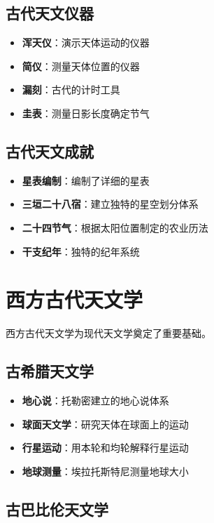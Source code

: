 \documentclass[12pt,UTF8]{ctexbook}
\begin{document}
\subsection{古代天文仪器}

\begin{itemize}
  \item \textbf{浑天仪}：演示天体运动的仪器
  \item \textbf{简仪}：测量天体位置的仪器
  \item \textbf{漏刻}：古代的计时工具
  \item \textbf{圭表}：测量日影长度确定节气
\end{itemize}

\subsection{古代天文成就}

\begin{itemize}
  \item \textbf{星表编制}：编制了详细的星表
  \item \textbf{三垣二十八宿}：建立独特的星空划分体系
  \item \textbf{二十四节气}：根据太阳位置制定的农业历法
  \item \textbf{干支纪年}：独特的纪年系统
\end{itemize}

\section{西方古代天文学}

西方古代天文学为现代天文学奠定了重要基础。

\subsection{古希腊天文学}

\begin{itemize}
  \item \textbf{地心说}：托勒密建立的地心说体系
  \item \textbf{球面天文学}：研究天体在球面上的运动
  \item \textbf{行星运动}：用本轮和均轮解释行星运动
  \item \textbf{地球测量}：埃拉托斯特尼测量地球大小
\end{itemize}

\subsection{古巴比伦天文学}
\end{document}

